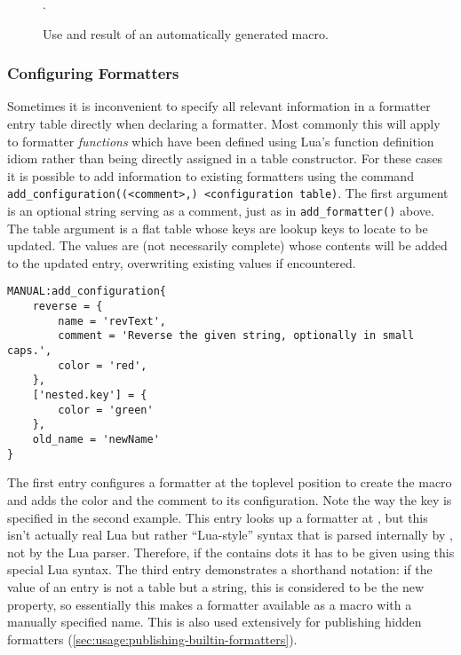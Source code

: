 \documentclass[12pt]{scrartcl}
\begin{document}
\begin{figure}
.
\caption{Use and result of an automatically generated macro.}
\label{fig:bookShortUse}
\end{figure}


\subsubsection{Configuring Formatters}
\label{sec:usage:configuring-formatters}

Sometimes it is inconvenient to specify all relevant information in a formatter
entry table directly when declaring a formatter.  Most commonly this will
apply to formatter \emph{functions} which have been defined using Lua's function
definition idiom rather than being directly assigned in a table constructor.
For these cases it is possible to add information to existing formatters using
the command \texttt{add_configuration((<comment>,) <configuration
table)}. The first argument is an optional string serving as a comment, just as in \texttt{add_formatter()} above.  The table argument is a flat table whose keys are lookup keys to locate  to be updated. The values are (not necessarily complete)  whose contents will be added to the updated entry, overwriting existing values if encountered.

\begin{verbatim}
MANUAL:add_configuration{
	reverse = {
	    name = 'revText',
	    comment = 'Reverse the given string, optionally in small caps.',
	    color = 'red',
	},
	['nested.key'] = {
		color = 'green'
	},
	old_name = 'newName'
}
\end{verbatim}

\noindent The first entry configures a formatter at the toplevel position
 to create the macro  and adds the color and the
comment to its configuration.  Note the way the key is specified in the second
example.  This entry looks up a formatter at , but this isn't
actually real Lua but rather “Lua-style” syntax that is parsed internally by
\luaformatters, not by the Lua parser.  Therefore, if the  contains
dots it has to be given using this special Lua syntax.  The third entry
demonstrates a shorthand notation: if the value of an entry is not a table but a
string, this is considered to be the new  property, so essentially
this makes a formatter available as a macro with a manually specified name.
This is also used extensively for publishing hidden formatters
(\vref{sec:usage:publishing-builtin-formatters}).
\end{document}
